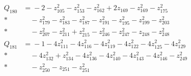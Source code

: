 \begin{align*}
Q_{180} &={}-2 - z_{105}^{2} - z_{153}^{2} - z_{162}^{2} + 2z_{169} - z_{169}^{2} - z_{175}^{2}\\*
&\quad{} - z_{179}^{2} - z_{183}^{2} - z_{187}^{2} - z_{191}^{2} - z_{195}^{2} - z_{199}^{2} - z_{203}^{2}\\*
&\quad{} - z_{207}^{2} - z_{211}^{2} + z_{215}^{2} - z_{246}^{2} - z_{247}^{2} - z_{248} - z_{248}^{2}\\[4pt]
Q_{181} &={}-1 - 4z_{111}^{2} - 4z_{116}^{2} - 4z_{119}^{2} - 4z_{122}^{2} - 4z_{125}^{2} - 4z_{129}^{2}\\*
&\quad{} - 4z_{132}^{2} + z_{134}^{2} - 4z_{136}^{2} - 4z_{140}^{2} - 4z_{143}^{2} - 4z_{146}^{2} - z_{249}^{2}\\*
&\quad{} - z_{250}^{2} - z_{251} - z_{251}^{2}
\end{align*}
\endgroup
